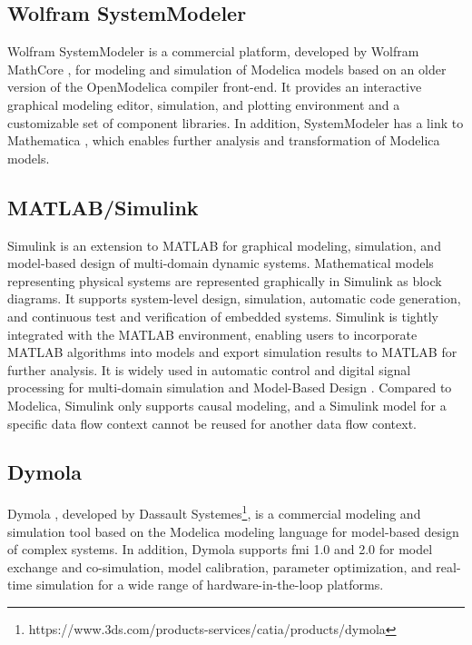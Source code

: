 \subsection{Wolfram SystemModeler}
\label{sec:wolfram}

Wolfram SystemModeler \cite{wolfram, wolframmats, wolframpeter} is a commercial platform, developed by Wolfram MathCore \cite{wolfram}, for modeling and simulation of Modelica models based on an older version of the OpenModelica compiler front-end. It provides an interactive graphical modeling editor, simulation, and plotting environment and a customizable set of component libraries. In addition, SystemModeler has a link to Mathematica \cite{mathematica}, which enables further analysis and transformation of Modelica models.

\subsection{MATLAB/Simulink}
\label{sec:simulink}

Simulink \cite{simulink} is an extension to MATLAB for graphical modeling, simulation, and model-based design of multi-domain dynamic systems. Mathematical models representing physical systems are represented graphically in Simulink as block diagrams. It supports system-level design, simulation, automatic code generation, and continuous test and verification of embedded systems.
Simulink is tightly integrated with the MATLAB environment, enabling users to incorporate MATLAB algorithms into models and export simulation results to MATLAB for further analysis. It is widely used in automatic control and digital signal processing for multi-domain simulation and Model-Based Design \cite{simulinkchristian,simulinkreedy}. Compared to Modelica, Simulink only supports causal modeling, and a Simulink model for a specific data flow context cannot be reused for another data flow context.

\subsection{Dymola}
\label{sec:dymola}

Dymola \cite{dymola,dymoladag}, developed by Dassault Systemes\footnote{https://www.3ds.com/products-services/catia/products/dymola}, is a commercial modeling and simulation tool based on the Modelica modeling language for model-based design of complex systems. In addition, Dymola supports \acrshort{fmi} 1.0 and 2.0 for model exchange and co-simulation, model calibration, parameter optimization, and real-time simulation for a wide range of hardware-in-the-loop platforms.

